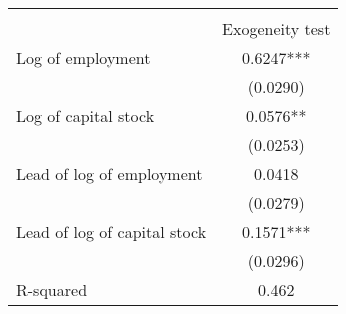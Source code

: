 \begin{tabular}{lc}
\hline\hline\\[-1.8ex]
 & Exogeneity test \\
\hline
Log of employment & 0.6247*** \\
 & (0.0290) \\
Log of capital stock & 0.0576** \\
 & (0.0253) \\
Lead of log of employment & 0.0418 \\
 & (0.0279) \\
Lead of log of capital stock & 0.1571*** \\
 & (0.0296) \\
\hline
R-squared & 0.462 \\
\hline\hline
\end{tabular}